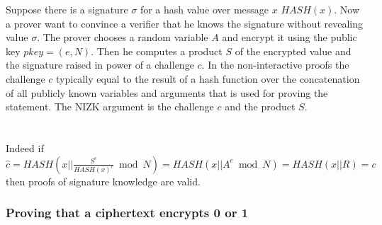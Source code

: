 Suppose there is a signature $\sigma$ for a hash value over message $x$ $HASH(x)$. Now a prover want to convince a verifier that he knows the signature without revealing value $\sigma$. The prover chooses a random variable $A$ and encrypt it using the public key $pkey = (e,N)$. Then he computes a product $S$ of the encrypted value and the signature raised in power of a challenge $c$. In the non-interactive proofs the challenge $c$ typically equal to the result of a hash function over the concatenation of all publicly known variables and arguments that is used for proving the statement. The NIZK argument is the challenge $c$ and the product $S$.\\\\
\\

Indeed if $\hat{c} = HASH(x|| \frac{S^e}{HASH(x)^c}\bmod N )= HASH(x|| A^e\bmod N ) =  HASH(x||R) = c$ then proofs of signature knowledge are valid.
\subsubsection{Proving that a ciphertext encrypts 0 or 1}

